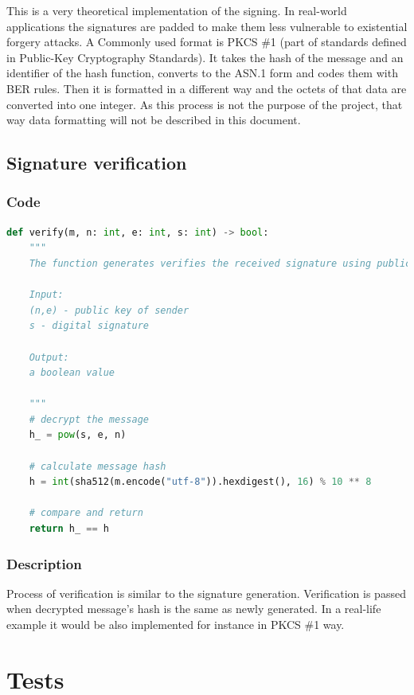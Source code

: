 \documentclass{article}
\begin{document}
This is a very theoretical implementation of the signing. In real-world applications the signatures are padded
to make them less vulnerable to existential forgery attacks. A Commonly used format is PKCS \#1 (part
of standards defined in Public-Key Cryptography Standards). It takes the hash of the message and an
identifier of the hash function, converts to the ASN.1 form and codes them with BER rules. Then
it is formatted in a different way and the octets of that data are converted into one integer.
As this process is not the purpose of the project, that way data formatting will not be described
in this document.

\subsection{Signature verification}
\subsubsection{Code}

\small

\begin{lstlisting}[language=Python]
    def verify(m, n: int, e: int, s: int) -> bool:
    """
    The function generates verifies the received signature using public key.

    Input:
    (n,e) - public key of sender
    s - digital signature

    Output:
    a boolean value

    """
    # decrypt the message
    h_ = pow(s, e, n)

    # calculate message hash
    h = int(sha512(m.encode("utf-8")).hexdigest(), 16) % 10 ** 8

    # compare and return
    return h_ == h    
\end{lstlisting}

\normalsize

\subsubsection{Description}
Process of verification is similar to the signature generation. Verification is passed when
decrypted message's hash is the same as newly generated. In a real-life example it would be also
implemented for instance in PKCS \#1 way.

\section{Tests}
\end{document}
